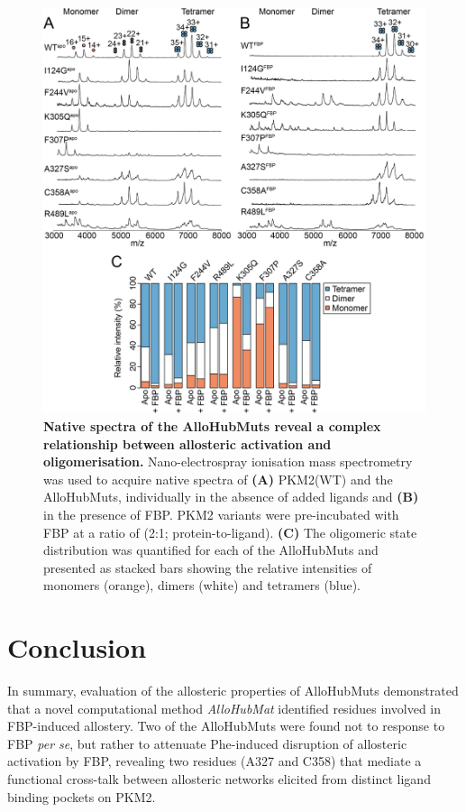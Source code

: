 %
%
%
%
%
\begin{figure}[!ht]
\includegraphics[scale=0.7]{ch7_fig8_muts_nMS.png}
\caption[Native spectra of the AlloHubMuts reveal a complex relationship between allosteric activation and oligomerisation.] {\textbf{Native spectra of the AlloHubMuts reveal a complex relationship between allosteric activation and oligomerisation.} Nano-electrospray ionisation mass spectrometry was used to acquire native spectra of \textbf{(A)} PKM2(WT) and the AlloHubMuts, individually in the absence of added ligands and \textbf{(B)} in the presence of FBP. PKM2 variants were pre-incubated with FBP at a ratio of (2:1; protein-to-ligand). \textbf{(C)} The oligomeric state distribution was quantified for each of the AlloHubMuts and presented as stacked bars showing the relative intensities of monomers (orange), dimers (white) and tetramers (blue).}
\label{fig:allohubmut_ms}
\end{figure}
%
%
\clearpage



\section{Conclusion}
In summary, evaluation of the allosteric properties of AlloHubMuts demonstrated that a novel computational method \textit{AlloHubMat} identified residues involved in FBP-induced allostery. Two of the AlloHubMuts were found not to response to FBP \textit{per se}, but rather to attenuate Phe-induced disruption of allosteric activation by FBP, revealing two residues (A327 and C358) that mediate a functional cross-talk between allosteric networks elicited from distinct ligand binding pockets on PKM2. 











